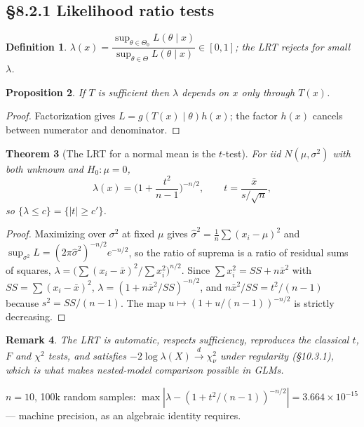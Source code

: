 \documentclass[11pt]{article}
\newtheorem{theorem}{Theorem}[section]
\newtheorem{definition}[theorem]{Definition}
\newtheorem{remark}[theorem]{Remark}
\newtheorem{proposition}[theorem]{Proposition}
\newcommand{\convD}{\xrightarrow{d}}
\begin{document}
\subsection{\S8.2.1 Likelihood ratio tests}
\begin{definition}
$\lambda(x)=\dfrac{\sup_{\theta\in\Theta_0}L(\theta\mid x)}{\sup_{\theta\in\Theta}L(\theta\mid x)}\in[0,1]$; the LRT rejects for small $\lambda$.
\end{definition}
\begin{proposition}
If $T$ is sufficient then $\lambda$ depends on $x$ only through $T(x)$.
\end{proposition}
\begin{proof}
Factorization gives $L=g(T(x)\mid\theta)h(x)$; the factor $h(x)$ cancels between numerator and denominator.
\end{proof}
\begin{theorem}[The LRT for a normal mean is the $t$-test]
For iid $N(\mu,\sigma^2)$ with both unknown and $H_0:\mu=0$,
\[\lambda(x)=\Big(1+\frac{t^2}{n-1}\Big)^{-n/2},\qquad t=\frac{\bar x}{s/\sqrt n},\]
so $\{\lambda\le c\}=\{|t|\ge c'\}$.
\end{theorem}
\begin{proof}
Maximizing over $\sigma^2$ at fixed $\mu$ gives $\hat\sigma^2=\frac1n\sum(x_i-\mu)^2$ and $\sup_{\sigma^2}L=(2\pi\hat\sigma^2)^{-n/2}e^{-n/2}$, so the ratio of suprema is a ratio of residual sums of squares, $\lambda=\big(\sum(x_i-\bar x)^2/\sum x_i^2\big)^{n/2}$. Since $\sum x_i^2=SS+n\bar x^2$ with $SS=\sum(x_i-\bar x)^2$, $\lambda=(1+n\bar x^2/SS)^{-n/2}$, and $n\bar x^2/SS=t^2/(n-1)$ because $s^2=SS/(n-1)$. The map $u\mapsto(1+u/(n-1))^{-n/2}$ is strictly decreasing.
\end{proof}
\begin{remark}
The LRT is automatic, respects sufficiency, reproduces the classical $t$, $F$ and $\chi^2$ tests, and satisfies $-2\log\lambda(X)\convD\chi^2_\nu$ under regularity (\S10.3.1), which is what makes nested-model comparison possible in GLMs.
\end{remark}
\begin{simbox}
$n=10$, 100k random samples: $\max|\lambda-(1+t^2/(n-1))^{-n/2}|=3.664\times10^{-15}$ --- machine precision, as an algebraic identity requires.
\end{simbox}
\end{document}
